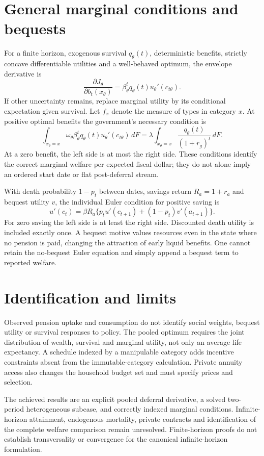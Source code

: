 \documentclass[11pt]{article}
\begin{document}
\section{General marginal conditions and bequests}
For a finite horizon, exogenous survival $q_\theta(t)$, deterministic benefits, strictly concave differentiable utilities and a well-behaved optimum, the envelope derivative is
\[
 \frac{\partial J_\theta}{\partial b_t(x_\theta)}
 =\beta_\theta^tq_\theta(t)u_\theta'(c_{t\theta}).
\]
If other uncertainty remains, replace marginal utility by its conditional expectation given survival. Let $f_x$ denote the measure of types in category $x$. At positive optimal benefits the government's necessary condition is
\[
 \int_{x_\theta=x}\omega_\theta\beta_\theta^tq_\theta(t)
      u_\theta'(c_{t\theta})\,dF
 =\lambda\int_{x_\theta=x}\frac{q_\theta(t)}{(1+r_g)^t}\,dF.
\]
At a zero benefit, the left side is at most the right side. These conditions identify the correct marginal welfare per expected fiscal dollar; they do not alone imply an ordered start date or flat post-deferral stream.

With death probability $1-p_t$ between dates, savings return $R_a=1+r_a$ and bequest utility $v$, the individual Euler condition for positive saving is
\[
 u'(c_t)=\beta R_a\{p_tu'(c_{t+1})+(1-p_t)v'(a_{t+1})\}.
\]
For zero saving the left side is at least the right side. Discounted death utility is included exactly once. A bequest motive values resources even in the state where no pension is paid, changing the attraction of early liquid benefits. One cannot retain the no-bequest Euler equation and simply append a bequest term to reported welfare.

\section{Identification and limits}
Observed pension uptake and consumption do not identify social weights, bequest utility or survival responses to policy. The pooled optimum requires the joint distribution of wealth, survival and marginal utility, not only an average life expectancy. A schedule indexed by a manipulable category adds incentive constraints absent from the immutable-category calculation. Private annuity access also changes the household budget set and must specify prices and selection.

The achieved results are an explicit pooled deferral derivative, a solved two-period heterogeneous subcase, and correctly indexed marginal conditions. Infinite-horizon attainment, endogenous mortality, private contracts and identification of the complete welfare comparison remain unresolved. Finite-horizon proofs do not establish transversality or convergence for the canonical infinite-horizon formulation.
\end{document}
